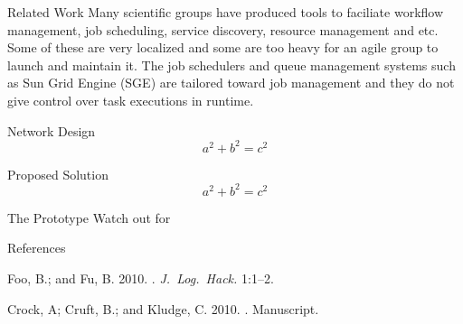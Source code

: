 \documentclass[final,hyperref={pdfpagelabels=true}]{beamer}
\newenvironment{postit}
{\begin{beamercolorbox}[sep=1em,wd=7cm]{postit}}
{\end{beamercolorbox}}
\begin{document}
\begin{frame}
\begin{columns}[t]
    \begin{column}{.45\textwidth}
      \begin{block}{Related Work}
        Many scientific groups have produced tools to faciliate workflow management, job scheduling,
        service discovery, resource management and etc. Some of these are very localized and some are
        too heavy for an agile group to launch and maintain it. The job schedulers and queue management
        systems such as Sun Grid Engine (SGE) are tailored toward job management and they do not give
        control over task executions in runtime.
      \end{block}

      \begin{block}{Network Design}
        \begin{equation}
          a^2+b^2=c^2
        \end{equation}
      \end{block}
      
      \begin{block}{Proposed Solution}
        \begin{equation}
          a^2+b^2=c^2
        \end{equation}
      \end{block}

      \begin{block}{The Prototype}
        \alert{Watch out for } \cite{ff2010}
      \end{block}

      \begin{block}{References}
        \begin{thebibliography}{999}
          
          Foo, B.; and Fu, B.
          2010.
          .
          {\em J.~Log.~Hack.} 1:1--2.
          
          Crock, A; Cruft, B.; and Kludge, C.
          2010.
          .
          Manuscript.
          
        \end{thebibliography}
      \end{block}
    \end{column}
  \end{columns}

  
\end{frame}
\end{document}
